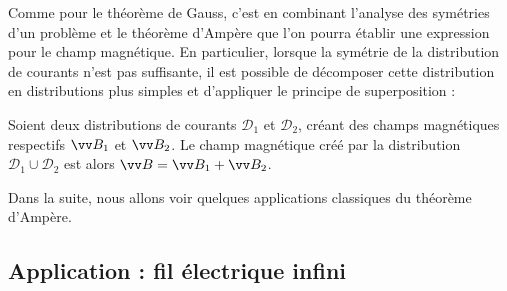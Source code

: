 \documentclass[11pt,fleqn]{book} %
\begin{document}
Comme pour le théorème de Gauss, c'est en combinant l'analyse des symétries d'un problème et le théorème d'Ampère que l'on pourra établir une expression pour le champ magnétique. En particulier, lorsque la symétrie de la distribution de courants n'est pas suffisante, il est possible de décomposer cette distribution en distributions plus simples et d'appliquer le principe de superposition :

\begin{proposition}
Soient deux distributions de courants $\mathcal{D}_1$ et $\mathcal{D}_2$, créant des champs magnétiques respectifs $\vv B_1$ et $\vv B_2$. Le champ magnétique créé par la distribution $\mathcal{D}_1 \cup \mathcal{D}_2$ est alors $\vv B = \vv B_1 + \vv B_2$.
\end{proposition}

Dans la suite, nous allons voir quelques applications classiques du théorème d'Ampère.

\subsection{Application : fil électrique infini}
\end{document}
